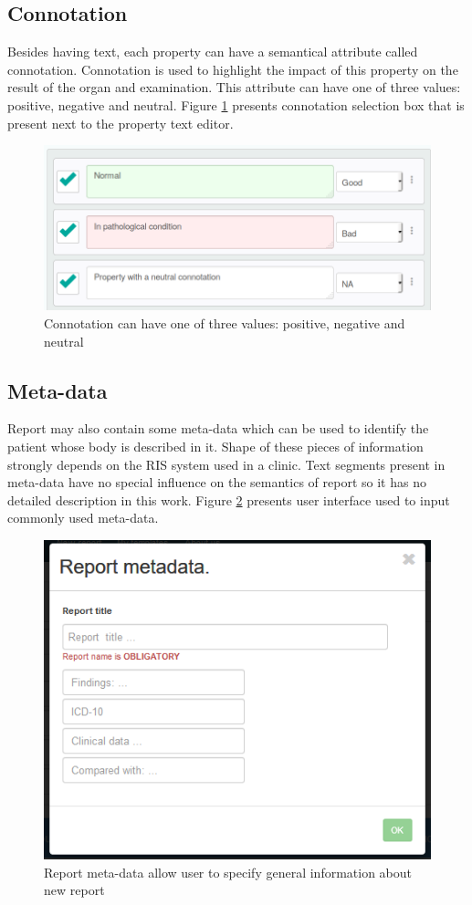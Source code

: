 \documentclass[12pt, twoside, openany]{report}
\theoremstyle{definition}
\begin{document}
\subsection{Connotation}
Besides having text, each property can have a semantical attribute called connotation. Connotation is used to highlight the impact of this property on the result of the organ and examination. This attribute can have one of three values: positive, negative and neutral. Figure \ref{fig:property-connotation} presents connotation selection box that is present next to the property text editor. 
\begin{figure}
	\centering
	\includegraphics[width=0.8\linewidth]{property-connotation}
	\caption{Connotation can have one of three values: positive, negative and neutral
		\label{fig:property-connotation}
	}
\end{figure}

\subsection{Meta-data}
Report may also contain some meta-data which can be used to identify the patient whose body is described in it. Shape of these pieces of information strongly depends on the RIS system used in a clinic. Text segments present in meta-data have no special influence on the semantics of report so it has no detailed description in this work. Figure \ref{fig:report-metadata} presents user interface used to input commonly used meta-data.
\begin{figure}
	\centering
	\includegraphics[width=0.6\linewidth]{report-metadata}
	\caption{Report meta-data allow user to specify general information about new report
    \label{fig:report-metadata}
	}
\end{figure}
\end{document}
